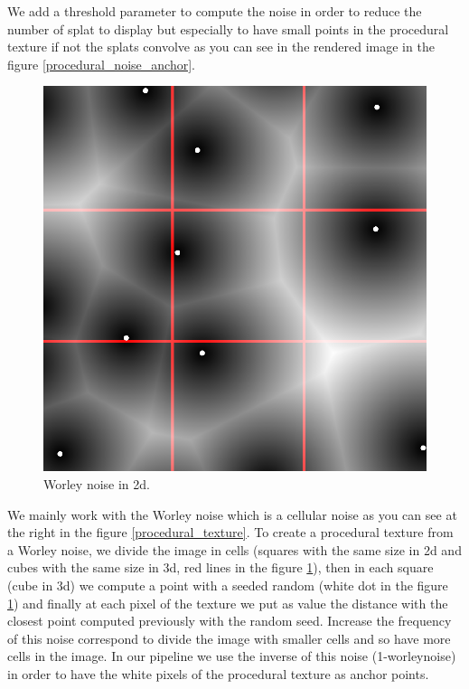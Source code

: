We add a threshold parameter to compute the noise in order to reduce the number of splat to display but especially to have small points in the procedural texture if not the splats convolve as you can see in the rendered image in the figure \ref{procedural_noise_anchor}.


\begin{figure}
    \begin{center}
    \includegraphics[scale=0.2]{images/noise/worley_explain.png}
    \end{center}
    \caption{Worley noise in 2d.}
    \label{worley_explain}
\end{figure}

We mainly work with the Worley noise which is a cellular noise as you can see at the right in the figure \ref{procedural_texture}. To create a procedural texture from a Worley noise, we divide the image in cells (squares with the same size in 2d and cubes with the same size in 3d, red lines in the figure \ref{worley_explain}), then in each square (cube in 3d) we compute a point with a seeded random (white dot in the figure \ref{worley_explain}) and finally at each pixel of the texture we put as value the distance with the closest point computed previously with the random seed. Increase the frequency of this noise correspond to divide the image with smaller cells and so have more cells in the image. In our pipeline we use the inverse of this noise (1-worleynoise) in order to have the white pixels of the procedural texture as anchor points.

